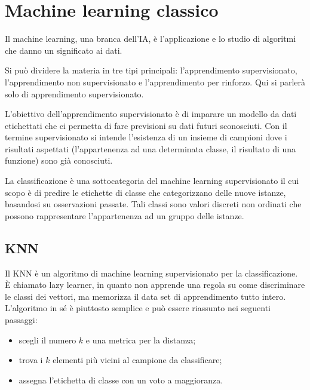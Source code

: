 \section{Machine learning classico} \label{sec:machine_learning}


\begin{definition}
    Il machine learning, una branca dell'\ac{IA}, è l'applicazione e lo studio  
    di algoritmi che danno un significato ai dati. 
\end{definition}

Si può dividere la materia in tre tipi principali: l'apprendimento supervisionato, 
l'apprendimento non supervisionato e l'apprendimento per rinforzo. 
Qui si parlerà solo di apprendimento supervisionato. 

L'obiettivo dell'apprendimento supervisionato è di imparare un modello da dati 
etichettati che ci permetta di fare previsioni su dati futuri sconosciuti. 
Con il termine supervisionato si intende l'esistenza di un insieme di campioni 
dove i risultati aspettati (l'appartenenza ad una determinata classe, il 
risultato di una funzione) sono già conosciuti. 

La classificazione
è una sottocategoria del machine learning supervisionato il cui 
scopo è di predire le etichette di classe che categorizzano delle nuove istanze, 
basandosi su osservazioni passate. Tali classi sono valori discreti non ordinati 
che possono rappresentare l'appartenenza ad un gruppo delle istanze. 

\subsection{KNN} \label{sec:knn}

Il \acf{KNN} è un algoritmo di machine learning supervisionato per la classificazione. 
È chiamato lazy learner, in quanto non apprende una regola su come discriminare 
le classi dei vettori, ma memorizza il data set di apprendimento tutto intero. 
L'algoritmo in sé è piuttosto semplice e può essere riassunto nei seguenti passaggi: 
\begin{itemize}
    \item scegli il numero $k$ e una metrica per la distanza; 
    \item trova i $k$ elementi più vicini al campione da classificare; 
    \item assegna l'etichetta di classe con un voto a maggioranza. 
\end{itemize}

